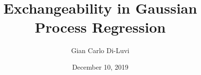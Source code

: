 \documentclass[10pt]{article}
\title{Exchangeability in Gaussian Process Regression} %
\author{Gian Carlo Di-Luvi} %
\date{December 10, 2019} %
\begin{document}
\maketitle














\clearpage
\appendix







\nocite{*}
\printbibliography
\end{document}
